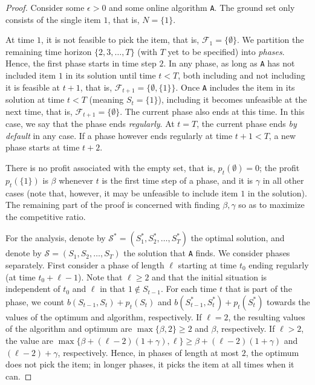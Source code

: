 \documentclass[a4paper]{book}
\newtheorem{proof}{\noindent{\bf Proof.} }
\begin{document}
\begin{proof}
	Consider some $\epsilon>0$ and some online algorithm \texttt{A}. The ground set only consists of the single item $1$, that is, $N=\{1\}$.
	
	At time $1$, it is not feasible to pick the item, that is, $\mathcal{F}_1=\{\emptyset\}$. We partition the remaining time horizon $\{2,3,\dots,T\}$ (with $T$ yet to be specified) into \emph{phases}. Hence, the first phase starts in time step $2$. In any phase, as long as \texttt{A} has not included item $1$ in its solution until time $t<T$, both including and not including it is feasible at $t+1$, that is, $\mathcal{F}_{t+1}=\{\emptyset,\{1\}\}$. Once \texttt{A} includes the item in its solution at time $t<T$ (meaning $S_{t}=\{1\}$), including it becomes unfeasible at the next time, that is, $\mathcal{F}_{t+1}=\{\emptyset\}$. The current phase also ends at this time. In this case, we say that the phase ends \emph{regularly}. At $t=T$, the current phase ends \emph{by default} in any case. If a phase however ends regularly at time $t+1<T$, a new phase starts at time $t+2$.
	
 There is no profit associated with the empty set, that is, $p_t(\emptyset)=0$; the profit $p_t(\{1\})$ is $\beta$ whenever $t$ is the first time step of a phase, and it is $\gamma$ in all other cases (note that, however, it may be unfeasible to include item $1$ in the solution).  The remaining part of the proof is concerned with finding $\beta,\gamma$ so as to maximize the competitive ratio. %
	
	For the analysis, denote by $\mathcal{S}^*=(S^*_1,S^*_2,\dots,S^*_T)$ the optimal solution, and denote by $\mathcal{S}=(S_1,S_2,\dots,S_T)$ the solution that \texttt{A} finds. We consider phases separately. First consider a phase of length $\ell$ starting at time $t_0$ ending regularly (at time $t_0+\ell-1$). Note that $\ell\geq2$ and that the initial situation is independent of $t_0$ and $\ell$ in that $1\notin S_{t-1}$. For each time $t$ that is part of the phase, we count $b(S_{t-1},S_t)+p_t(S_t)$ and $b(S^*_{t-1},S^*_t)+p_t(S^*_t)$ towards the values of the optimum and algorithm, respectively. If $\ell=2$, the resulting values of the algorithm and optimum are $\max\{\beta,2\}\geq2$ and $\beta$, respectively. If $\ell>2$, the value are $\max\{\beta+(\ell-2)(1+\gamma),\ell\}\geq\beta+(\ell-2)(1+\gamma)$ and $(\ell-2)+\gamma$, respectively. Hence, in phases of length at most $2$, the optimum does not pick the item; in longer phases, it picks the item at all times when it can.
	

\end{proof}
\end{document}
